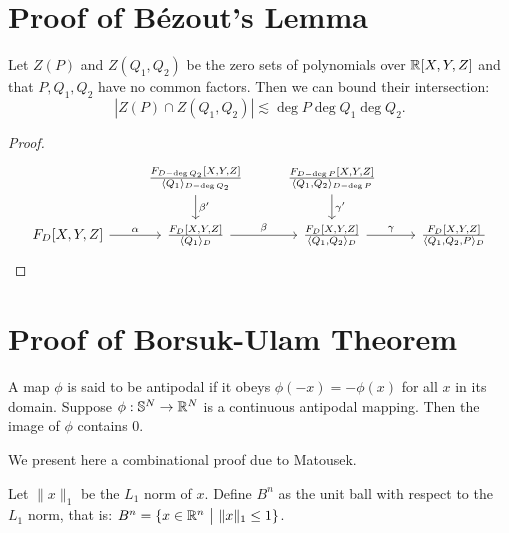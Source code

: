 \chapter{Proof of Bézout's Lemma}

\begin{lemma}     \label{appendix:Bezout}
    Let $Z(P)$ and $Z(Q_1,Q_2)$ be the zero sets of polynomials over $\mathbb R[X,Y,Z]$ and that $P,Q_1,Q_2$ have no common factors.
  Then we can bound their intersection:
     \[|Z(P) \cap Z(Q_1,Q_2)| \lesssim \deg P \deg Q_1 \deg Q_2.\]
 \end{lemma}
\begin{proof}
        \[\begin{tikzcd}
            & {\frac{F_{D-\deg Q_2}[X,Y,Z]}{\langle Q_1 \rangle_{D- \deg Q_2}}} & {\frac{F_{D-\deg P}[X,Y,Z]}{\langle Q_1, Q_2 \rangle_{D- \deg P}}} \\
            {F_D[X,Y,Z]} & {\frac{F_D[X,Y,Z]}{\langle Q_1 \rangle_D}} & {\frac{F_D[X,Y,Z]}{\langle Q_1, Q_2 \rangle_D}} & {\frac{F_D[X,Y,Z]}{\langle Q_1, Q_2, P \rangle_D}}
            \arrow["\alpha", from=2-1, to=2-2]
            \arrow["\beta", from=2-2, to=2-3]
            \arrow["\gamma", from=2-3, to=2-4]
            \arrow["{\beta'}", from=1-2, to=2-2]
            \arrow["{\gamma'}", from=1-3, to=2-3]
        \end{tikzcd}\]

\end{proof}



\chapter{Proof of Borsuk-Ulam Theorem}
    \begin{theorem}
        A map $\phi$ is said to be antipodal if it obeys $\phi (-x) = -\phi(x)$ for all $x$ in its domain. Suppose $\phi: \mathbb S^N \to \mathbb R^N$ is a continuous antipodal mapping. 
        Then the image of $\phi$ contains 0. \label{appendix:Borsuk-Ulam}
    \end{theorem}
We present here a combinational proof due to Matousek.\cite{matouvsek2003using} 

Let $\|x\|_1$ be the $L_1$ norm of $x$. Define $B^n$ as the unit ball with respect to the $L_1$ norm, 
that is: $B^n = \{x\in \RR^n \ \big | \ \|x\|_1 \leq 1 \}$.

